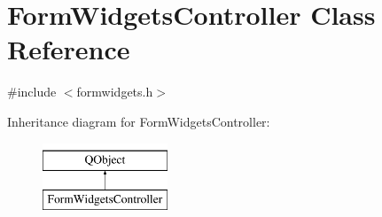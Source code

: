 \hypertarget{classFormWidgetsController}{\section{Form\+Widgets\+Controller Class Reference}
\label{classFormWidgetsController}
}


{\ttfamily \#include $<$formwidgets.\+h$>$}

Inheritance diagram for Form\+Widgets\+Controller\+:\begin{figure}[H]
\begin{center}
\leavevmode
\includegraphics[height=2.000000cm]{classFormWidgetsController}
\end{center}
\end{figure}
